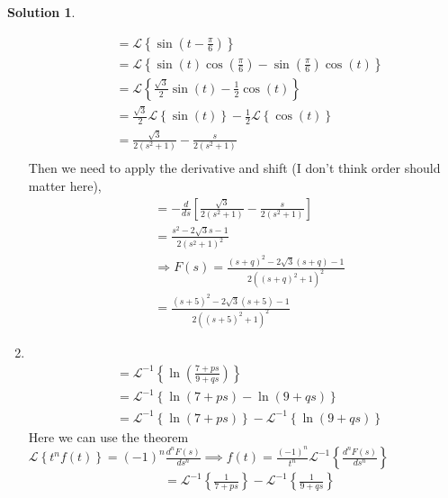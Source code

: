 \documentclass[10pt]{article}
\theoremstyle{definition}
\newtheorem{soln}{Solution}
\newcommand{\laplace}[1]{\mathcal{L}\left\{#1\right\}}
\newcommand{\laplacei}[1]{\mathcal{L}^{-1}\left\{#1\right\}}
\begin{document}
\begin{soln}
\begin{enumerate}[label=(\alph*)]
\begin{align*}
             & =\laplace{\sin\left(t-\frac{\pi}{6}\right)}                                                                  \\
             & =\laplace{\sin\left(t\right)\cos\left(\frac{\pi}{6}\right)-\sin\left(\frac{\pi}{6}\right)\cos\left(t\right)} \\
             & =\laplace{\frac{\sqrt{3}}{2}\sin\left(t\right)-\frac{1}{2}\cos\left(t\right)}                                \\
             & =\frac{\sqrt{3}}{2}\laplace{\sin\left(t\right)}-\frac{1}{2}\laplace{\cos\left(t\right)}                      \\
             & =\frac{\sqrt{3}}{2\left(s^2+1\right)}-\frac{s}{2\left(s^2+1\right)}                                          \\
          \end{align*}
          Then we need to apply the derivative and shift (I don't think order should matter here),
          \begin{align*}
             & =-\frac{d}{ds}\left[\frac{\sqrt{3}}{2\left(s^2+1\right)}-\frac{s}{2\left(s^2+1\right)}\right]                \\
             & =\frac{s^2-2\sqrt{3}s-1}{2\left(s^2+1\right)^2}                                                              \\
             & \Rightarrow F(s)=\frac{\left(s+q\right)^2-2\sqrt{3}\left(s+q\right)-1}{2\left(\left(s+q\right)^2+1\right)^2} \\
             & =\frac{\left(s+5\right)^2-2\sqrt{3}\left(s+5\right)-1}{2\left(\left(s+5\right)^2+1\right)^2}
          \end{align*}
    \item ~
          \begin{align*}
             & =\laplacei{\ln\left(\frac{7+ps}{9+qs}\right)}                    \\
             & =\laplacei{\ln\left(7+ps\right)-\ln\left(9+qs\right)}            \\
             & =\laplacei{\ln\left(7+ps\right)}-\laplacei{\ln\left(9+qs\right)}
          \end{align*}
          Here we can use the theorem $\displaystyle\laplace{t^nf(t)}=\left(-1\right)^{n}\frac{d^nF(s)}{ds^n}\implies f(t)=\frac{\left(-1\right)^{n}}{t^n}\laplacei{\frac{d^nF(s)}{ds^n}}$
          \begin{align*}
             & =\laplacei{\frac{1}{7+ps}}-\laplacei{\frac{1}{9+qs}}                   \\

\end{align*}
\end{enumerate}
\end{soln}
\end{document}
